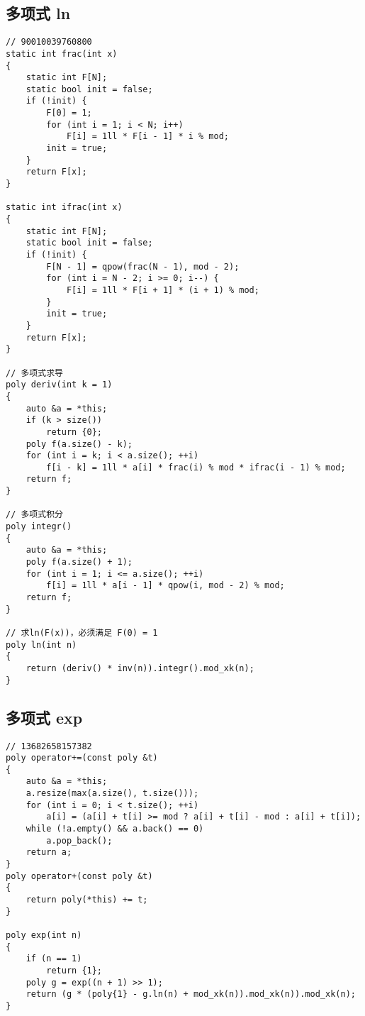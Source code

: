 \documentclass[twocolumn,a4]{article}
\begin{document}
\subsection{多项式 ln}
\begin{lstlisting}
// 90010039760800
static int frac(int x)
{
    static int F[N];
    static bool init = false;
    if (!init) {
        F[0] = 1;
        for (int i = 1; i < N; i++)
            F[i] = 1ll * F[i - 1] * i % mod;
        init = true;
    }
    return F[x];
}

static int ifrac(int x)
{
    static int F[N];
    static bool init = false;
    if (!init) {
        F[N - 1] = qpow(frac(N - 1), mod - 2);
        for (int i = N - 2; i >= 0; i--) {
            F[i] = 1ll * F[i + 1] * (i + 1) % mod;
        }
        init = true;
    }
    return F[x];
}

// 多项式求导
poly deriv(int k = 1)
{
    auto &a = *this;
    if (k > size())
        return {0};
    poly f(a.size() - k);
    for (int i = k; i < a.size(); ++i)
        f[i - k] = 1ll * a[i] * frac(i) % mod * ifrac(i - 1) % mod;
    return f;
}

// 多项式积分
poly integr()
{
    auto &a = *this;
    poly f(a.size() + 1);
    for (int i = 1; i <= a.size(); ++i)
        f[i] = 1ll * a[i - 1] * qpow(i, mod - 2) % mod;
    return f;
}

// 求ln(F(x))，必须满足 F(0) = 1
poly ln(int n)
{
    return (deriv() * inv(n)).integr().mod_xk(n);
}
\end{lstlisting}

\subsection{多项式 exp}
\begin{lstlisting}
// 13682658157382
poly operator+=(const poly &t)
{
    auto &a = *this;
    a.resize(max(a.size(), t.size()));
    for (int i = 0; i < t.size(); ++i)
        a[i] = (a[i] + t[i] >= mod ? a[i] + t[i] - mod : a[i] + t[i]);
    while (!a.empty() && a.back() == 0)
        a.pop_back();
    return a;
}
poly operator+(const poly &t)
{
    return poly(*this) += t;
}

poly exp(int n)
{
    if (n == 1)
        return {1};
    poly g = exp((n + 1) >> 1);
    return (g * (poly{1} - g.ln(n) + mod_xk(n)).mod_xk(n)).mod_xk(n);
}
\end{lstlisting}
\end{document}
